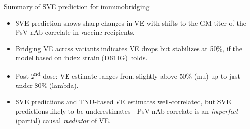 \documentclass{beamer}
\begin{document}
\begin{frame}[c]{Summary of SVE prediction for immunobridging}

\begin{center}
\begin{itemize}
  \itemsep6pt
  \item SVE prediction shows sharp changes in VE with shifts to the GM titer of
    the PsV nAb correlate in vaccine recipients.
  \item Bridging VE across variants indicates VE drops but stabilizes at 50\%,
    if the model based on index strain (D614G) holds.
  \item Post-2\textsuperscript{nd} dose: VE estimate ranges from slightly above
    50\% (mu) up to just under 80\% (lambda).
  \item SVE predictions and TND-based VE estimates well-correlated, but
      SVE predictions likely to be underestimates---PsV nAb correlate is an
      \textit{imperfect} (partial) causal \textit{mediator} of VE.
\end{itemize}
\end{center}

\note{
}

\end{frame}


\end{document}
